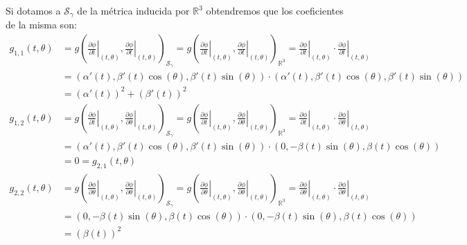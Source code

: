 \begin{example}
	Si dotamos a $\mathcal{S}_{\gamma}$ de la métrica inducida por $\mathbb{R}^3$ obtendremos que los coeficientes de la misma son:
	\begin{align*}
		g_{1,1}(t,\theta) & = g \left(
		\left. \frac{\partial \phi}{\partial t}\right|_{(t,\theta)},
		\left. \frac{\partial \phi}{\partial t}\right|_{(t,\theta)}
		\right)_{\mathcal{S}_{\gamma}} =
		g \left(
		\left. \frac{\partial \phi}{\partial t}\right|_{(t,\theta)},
		\left. \frac{\partial \phi}{\partial t}\right|_{(t,\theta)}
		\right)_{\mathbb{R}^{3}}                                   =
		\left. \frac{\partial \phi}{\partial t}\right|_{(t,\theta)} \cdot
		\left. \frac{\partial \phi}{\partial t}\right|_{(t,\theta)}      \\[12pt]
		                  & =
		(\alpha'(t), \beta'(t) \cos(\theta), \beta'(t)\sin(\theta)) \cdot
		(\alpha'(t), \beta'(t) \cos(\theta), \beta'(t)\sin(\theta))      \\
		                  & =
		(\alpha'(t))^{2} + (\beta'(t))^{2}                               \\[12pt]
		g_{1,2}(t,\theta) & = g \left(
		\left. \frac{\partial \phi}{\partial t}\right|_{(t,\theta)},
		\left. \frac{\partial \phi}{\partial \theta}\right|_{(t,\theta)}
		\right)_{\mathcal{S}_{\gamma}} =
		g \left(
		\left. \frac{\partial \phi}{\partial t}\right|_{(t,\theta)},
		\left. \frac{\partial \phi}{\partial \theta}\right|_{(t,\theta)}
		\right)_{\mathbb{R}^{3}}                                   =
		\left. \frac{\partial \phi}{\partial t}\right|_{(t,\theta)} \cdot
		\left. \frac{\partial \phi}{\partial \theta}\right|_{(t,\theta)} \\[12pt]
		                  & =
		(\alpha'(t), \beta'(t) \cos(\theta), \beta'(t)\sin(\theta)) \cdot
		(0, -\beta(t) \sin(\theta), \beta(t)\cos(\theta))                \\[12pt]
		                  & =
		0 = g_{2,1}(t,\theta)                                            \\[12pt]
		g_{2,2}(t,\theta) & = g \left(
		\left. \frac{\partial \phi}{\partial \theta}\right|_{(t,\theta)},
		\left. \frac{\partial \phi}{\partial \theta}\right|_{(t,\theta)}
		\right)_{\mathcal{S}_{\gamma}} =
		g \left(
		\left. \frac{\partial \phi}{\partial \theta}\right|_{(t,\theta)},
		\left. \frac{\partial \phi}{\partial \theta}\right|_{(t,\theta)}
		\right)_{\mathbb{R}^{3}}                                   =
		\left. \frac{\partial \phi}{\partial \theta}\right|_{(t,\theta)} \cdot
		\left. \frac{\partial \phi}{\partial \theta}\right|_{(t,\theta)} \\[12pt]
		                  & =
		(0, -\beta(t) \sin(\theta), \beta(t)\cos(\theta))   \cdot
		(0, -\beta(t) \sin(\theta), \beta(t)\cos(\theta))                \\[12pt]
		                  & =
		(\beta(t))^{2}
	\end{align*}
\end{example}

